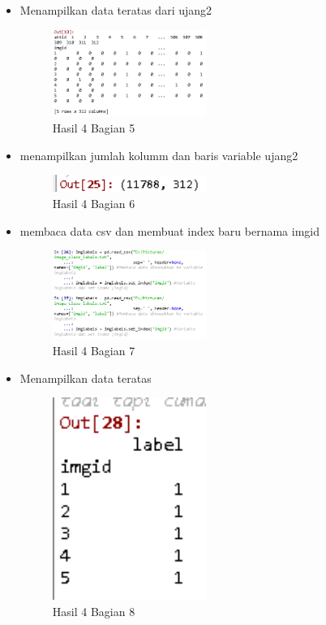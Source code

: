\begin{itemize}
\item Menampilkan data teratas dari ujang2

\begin{figure}[H]
\centerline{\includegraphics[width=5cm]{figures/1174079/3/praktek7.PNG}}
\caption{Hasil 4 Bagian 5}
\label{labelgambar}
\end{figure}

\item menampilkan jumlah kolumm dan baris variable ujang2

\begin{figure}[H]
\centerline{\includegraphics[width=5cm]{figures/1174079/3/praktek8.PNG}}
\caption{Hasil 4 Bagian 6}
\label{labelgambar}
\end{figure}

\item membaca data csv dan membuat index baru bernama imgid

\begin{figure}[H]
\centerline{\includegraphics[width=5cm]{figures/1174079/3/praktek9.PNG}}
\caption{Hasil 4 Bagian 7}
\label{labelgambar}
\end{figure}

\item Menampilkan data teratas

\begin{figure}[H]
\centerline{\includegraphics[width=5cm]{figures/1174079/3/praktek10.PNG}}
\caption{Hasil 4 Bagian 8}
\label{labelgambar}
\end{figure}


\end{itemize}

